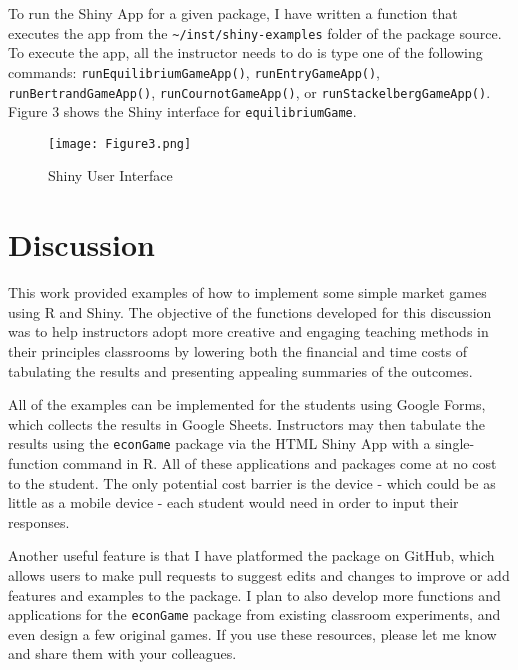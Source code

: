 \documentclass[
]{article}
\begin{document}
To run the Shiny App for a given package, I have written a function that
executes the app from the
\texttt{\textquotesingle{}\textasciitilde{}/inst/shiny-examples\textquotesingle{}}
folder of the package source. To execute the app, all the instructor
needs to do is type one of the following commands:
\texttt{\textquotesingle{}runEquilibriumGameApp()\textquotesingle{}},
\texttt{\textquotesingle{}runEntryGameApp()\textquotesingle{}},
\texttt{\textquotesingle{}runBertrandGameApp()\textquotesingle{}},
\texttt{\textquotesingle{}runCournotGameApp()\textquotesingle{}}, or
\texttt{\textquotesingle{}runStackelbergGameApp()\textquotesingle{}}.
Figure 3 shows the Shiny interface for \texttt{equilibriumGame}.

\begin{figure}
\centering
\texttt{[image: Figure3.png]}
\caption{Shiny User Interface}
\end{figure}

\hypertarget{discussion}{%
\section{Discussion}\label{discussion}}

This work provided examples of how to implement some simple market games
using R and Shiny. The objective of the functions developed for this
discussion was to help instructors adopt more creative and engaging
teaching methods in their principles classrooms by lowering both the
financial and time costs of tabulating the results and presenting
appealing summaries of the outcomes.

All of the examples can be implemented for the students using Google
Forms, which collects the results in Google Sheets. Instructors may then
tabulate the results using the \texttt{econGame} package via the HTML
Shiny App with a single-function command in R. All of these applications
and packages come at no cost to the student. The only potential cost
barrier is the device - which could be as little as a mobile device -
each student would need in order to input their responses.

Another useful feature is that I have platformed the package on GitHub,
which allows users to make pull requests to suggest edits and changes to
improve or add features and examples to the package. I plan to also
develop more functions and applications for the \texttt{econGame}
package from existing classroom experiments, and even design a few
original games. If you use these resources, please let me know and share
them with your colleagues.
\end{document}

